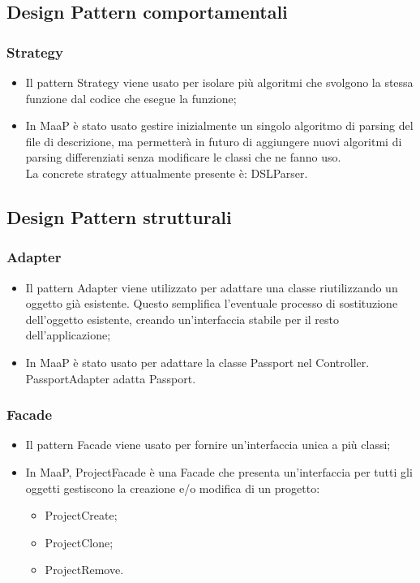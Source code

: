 \subsection{Design Pattern comportamentali}
\subsubsection{Strategy}
\begin{itemize}
\item {} Il pattern Strategy viene usato per isolare più algoritmi che svolgono la stessa funzione dal codice che esegue la funzione;
\item {} In MaaP è stato usato gestire inizialmente un singolo algoritmo di parsing del file di descrizione, ma permetterà in futuro di aggiungere nuovi algoritmi di parsing differenziati senza modificare le classi che ne fanno uso.\\
La concrete strategy attualmente presente è: DSLParser.
\end{itemize}

\subsection{Design Pattern strutturali}
\subsubsection{Adapter}
\begin{itemize}
\item {} Il pattern Adapter viene utilizzato per adattare una classe riutilizzando un oggetto già esistente. Questo semplifica l'eventuale processo di sostituzione dell'oggetto esistente, creando un'interfaccia stabile per il resto dell'applicazione;
\item {} In MaaP è stato usato per adattare la classe Passport nel Controller. PassportAdapter adatta Passport.
\end{itemize}

\subsubsection{Facade}
\begin{itemize}
\item {} Il pattern Facade viene usato per fornire un'interfaccia unica a più classi;
\item {} In MaaP, ProjectFacade è una Facade che presenta un'interfaccia per tutti gli oggetti gestiscono la creazione e/o modifica di un progetto:\\
\begin{itemize}
\item ProjectCreate;
\item ProjectClone;
\item ProjectRemove.
\end{itemize}
\end{itemize}

